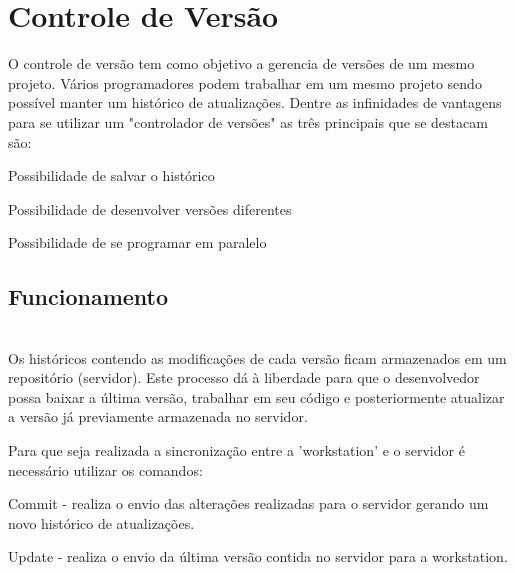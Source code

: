 \section{Controle de Versão}
\label{sec:Controle-de-Versão}

O controle de versão tem como objetivo a gerencia de versões de um mesmo projeto. Vários programadores podem trabalhar em um mesmo projeto sendo possível manter um histórico de atualizações.
Dentre as infinidades de vantagens para se utilizar um "controlador de versões" as três principais que se destacam são:
\begin{alineascomponto}
	
   \item Possibilidade de salvar o histórico
   \item Possibilidade de desenvolver versões diferentes
   \item Possibilidade de se programar em paralelo

	\end{alineascomponto}

\subsection{Funcionamento}\\
Os históricos contendo as modificações de cada versão ficam armazenados em um repositório (servidor). Este processo dá à liberdade para que o desenvolvedor possa baixar a última versão, trabalhar em seu código e posteriormente atualizar a versão já previamente armazenada no servidor.
	\begin{figure}[h!]
		\centering
	\end{figure}
	
	Para que seja realizada a sincronização entre a 'workstation' e o servidor é necessário utilizar os comandos:
	
	\begin{alineascomponto}
\item Commit - realiza o envio das alterações realizadas para o servidor gerando um novo histórico de atualizações.
\item Update - realiza o envio da última versão contida no servidor para a workstation.

	\end{alineascomponto}

